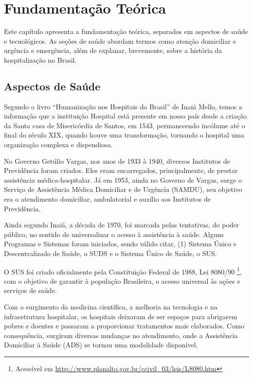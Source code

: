 \chapter{Fundamentação Teórica}\label{cap:fundamentacao-teorica}

Este capítulo apresenta a fundamentação teórica, separados em aspectos
de saúde e tecnológicos. As seções de saúde abordam termos como atenção
domiciliar e urgência e emergência, além de explanar, brevemente, sobre
a história da hospitalização no Brasil. 

\section{Aspectos de Saúde}\label{sec:aspectos-de-saude}

Segundo o livro ``Humanização nos Hospitais do Brasil'' \cite{inaia2008} de Inaiá  Mello,
temos a informação que a instituição Hospital está presente em nosso país
desde a criação da Santa casa de Misericórdia de Santos, em 1543, permanecendo
incólume até o final do século XIX, quando houve uma transformação, tornando
o hospital uma organização complexa e dispendiosa.

No Governo Getúlio Vargas, nos anos de 1933 à 1940, diversos Institutos de
Previdência foram criados. Eles eram encarregados, principalmente, de prestar
assistência médica-hospitalar. Já em 1953, ainda no Governo de Vargas, surge 
o Serviço de Assistência Médica Domiciliar e de Urgência (SAMDU), seu 
objetivo era o atendimento domiciliar, ambulatorial e auxílio aos Institutos 
de Previdência.

Ainda segundo Inaiá, a década de 1970, foi marcada pelas tentativas, do poder público, no 
sentido de universalizar o acesso à assistência à saúde. Alguns Programas e 
Sistemas foram iniciados, sendo válido citar, (1) Sistema Único e Descentralizado 
de Saúde, o SUDS e o Sistema Único de Saúde, o SUS.

O SUS foi criado oficialmente pela Constituição Federal de 1988, Lei 8080/90
\footnote{Acessível em \url{http://www.planalto.gov.br/ccivil_03/leis/L8080.htm}},
com o objetivo de garantir à população Brasileira, o acesso universal às
ações e serviços de saúde.

Com o surgimento da medicina científica, a melhoria na tecnologia e na
infraestrutura hospitalar, os hospitais deixaram de ser espaços para 
abrigarem pobres e doentes e passaram a proporcionar tratamentos mais
elaborados. Como consequência, surgiram diversas mudanças no atendimento,
onde a Assistência Domiciliar à Saúde (ADS) se tornou uma modalidade
disponível.

